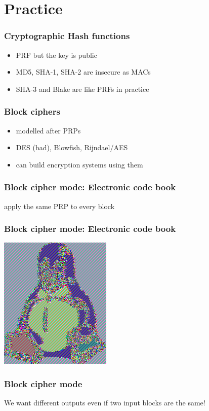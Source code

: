 \documentclass[serif,aspectratio=169]{beamer}
\begin{document}
	\section{Practice}
\begin{frame}
	\frametitle{Cryptographic Hash functions}
	\begin{itemize}
		\item PRF but the key is public
		\item MD5, SHA-1, SHA-2 are insecure as MACs
		\item SHA-3 and Blake are like PRFs in practice
	\end{itemize}
\end{frame}
\begin{frame}
	\frametitle{Block ciphers}
	\begin{itemize}
		\item modelled after PRPs
		\item DES (bad), Blowfish, Rĳndael/AES
		\item can build encryption systems using them
	\end{itemize}
\end{frame}
\begin{frame}
	\frametitle{Block cipher mode: Electronic code book}
	apply the same PRP to every block
\end{frame}
\begin{frame}
	\frametitle{Block cipher mode: Electronic code book}
	\begin{center}
		\includegraphics[height=0.8\textheight]{Tux_ECB.png}
	\end{center}
\end{frame}
\begin{frame}
	\frametitle{Block cipher mode}
	We want different outputs even if two input blocks are the same!
\end{frame}
\end{document}
